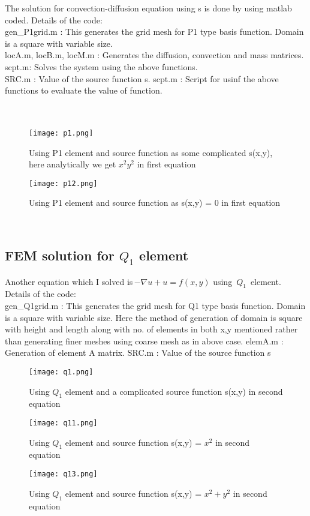 \documentclass[9pt]{article}
\begin{document}
The solution for convection-diffusion equation using s is done by using matlab coded.
Details of the code:\\
gen\_P1grid.m : This generates the grid mesh for P1 type basis function. Domain is a square with variable size.\\
locA.m, locB.m, locM.m : Generates the diffusion, convection and mass matrices.
\\scpt.m: Solves the system using the above functions.\\
SRC.m : Value of the source function s.
scpt.m : Script for usinf the above functions to evaluate the value of function.
\\ \\ \\
\begin{figure}[h]
\centering
\texttt{[image: p1.png]}
\caption{Using P1 element and source function as some complicated s(x,y), here analytically we get $x^2y^2$ in first equation}
\end{figure}
\begin{figure}[h]
\centering
\texttt{[image: p12.png]}
\caption{Using P1 element and source function as s(x,y) = 0 in first equation}
\end{figure}
\\
\newpage

\subsection{FEM solution for $Q_1$ element}

Another equation which I solved is\,$-\nabla u + u = f(x,y)$ using \,$Q_1$\, element.
Details of the code:\\
gen\_Q1grid.m : This generates the grid mesh for Q1 type basis function. Domain is a square with variable size. Here the method of generation of domain is square with height and length along with no. of elements in both x,y mentioned rather than generating finer meshes using coarse mesh as in above case.
elemA.m : Generation of element A matrix.
SRC.m : Value of the source function s
\begin{figure}[h]
\centering
\texttt{[image: q1.png]}
\caption{Using $Q_1$ element and a complicated source function s(x,y) in second equation}
\end{figure}

\begin{figure}[h]
\centering
\texttt{[image: q11.png]}
\caption{Using $Q_1$ element and source function s(x,y) = $x^2$ in second equation}
\end{figure}

\begin{figure}[h]
\centering
\texttt{[image: q13.png]}
\caption{Using $Q_1$ element and source function s(x,y) = $x^2+y^2$ in second equation}
\end{figure}
\end{document}
